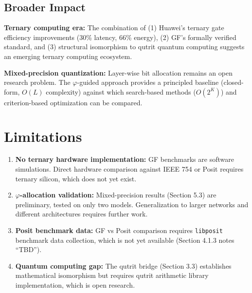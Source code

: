 \documentclass{article}
\begin{document}
\subsection{Broader Impact}

\textbf{Ternary computing era:} The combination of (1) Huawei's ternary gate efficiency improvements (30\% latency, 66\% energy), (2) GF's formally verified standard, and (3) structural isomorphism to qutrit quantum computing suggests an emerging ternary computing ecosystem.

\textbf{Mixed-precision quantization:} Layer-wise bit allocation remains an open research problem. The $\varphi$-guided approach provides a principled baseline (closed-form, $O(L)$ complexity) against which search-based methods ($O(2^K)$) and criterion-based optimization can be compared.


\section{Limitations}

\begin{enumerate}
    \item \textbf{No ternary hardware implementation:} GF benchmarks are software simulations. Direct hardware comparison against IEEE 754 or Posit requires ternary silicon, which does not yet exist.

    \item \textbf{$\varphi$-allocation validation:} Mixed-precision results (Section 5.3) are preliminary, tested on only two models. Generalization to larger networks and different architectures requires further work.

    \item \textbf{Posit benchmark data:} GF vs Posit comparison requires \texttt{libposit} benchmark data collection, which is not yet available (Section 4.1.3 notes ``TBD'').

    \item \textbf{Quantum computing gap:} The qutrit bridge (Section 3.3) establishes mathematical isomorphism but requires qutrit arithmetic library implementation, which is open research.
\end{enumerate}

\end{document}
